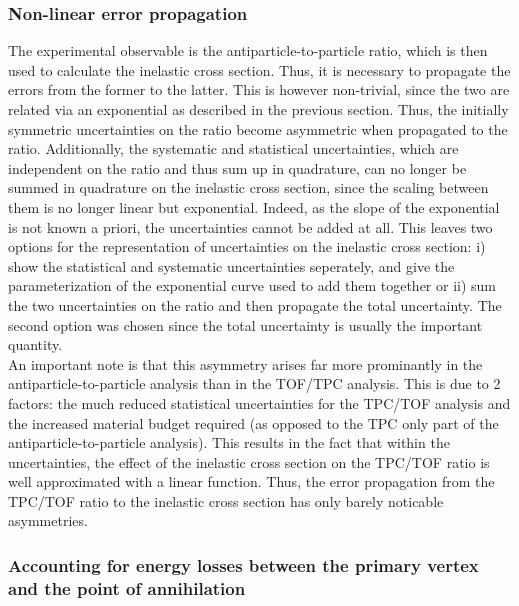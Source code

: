 \subsubsection{Non-linear error propagation}
The experimental observable is the antiparticle-to-particle ratio, which is then used to calculate the inelastic cross section. Thus, it is necessary to propagate the errors from the former to the latter. This is however non-trivial, since the two are related via an exponential as described in the previous section. Thus, the initially symmetric uncertainties on the ratio become asymmetric when propagated to the ratio. Additionally, the systematic and statistical uncertainties, which are independent on the ratio and thus sum up in quadrature, can no longer be summed in quadrature on the inelastic cross section, since the scaling between them is no longer linear but exponential. Indeed, as the slope of the exponential is not known a priori, the uncertainties cannot be added at all. This leaves two options for the representation of uncertainties on the inelastic cross section: i) show the statistical and systematic uncertainties seperately, and give the parameterization of the exponential curve used to add them together or ii) sum the two uncertainties on the ratio and then propagate the total uncertainty. The second option was chosen since the total uncertainty is usually the important quantity. \\

An important note is that this asymmetry arises far more prominantly in the antiparticle-to-particle analysis than in the TOF/TPC analysis. This is due to 2 factors: the much reduced statistical uncertainties for the TPC/TOF analysis and the increased material budget required (as opposed to the TPC only part of the antiparticle-to-particle analysis). This results in the fact that within the uncertainties, the effect of the inelastic cross section on the TPC/TOF ratio is well approximated with a linear function. Thus, the error propagation from the TPC/TOF ratio to the inelastic cross section has only barely noticable asymmetries. 

\subsubsection{Accounting for energy losses between the primary vertex and the point of annihilation}
